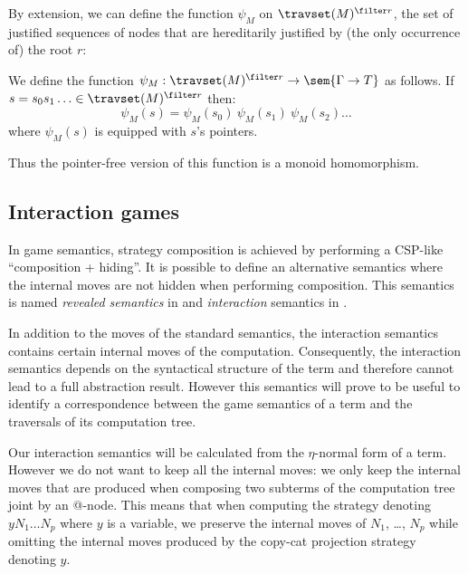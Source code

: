 By extension, we can define the function $\psi_M$ on $\travset(M)^{\filter r}$, the set of justified
sequences of nodes that are hereditarily justified by (the only occurrence of) the root $r$:
\begin{definition}
We define the function $\psi_M : \travset(M)^{\filter r} \rightarrow \sem{\Gamma \rightarrow T}$ as follows.
If $s = s_0 s_1 \ldots \in \travset(M)^{\filter r}$ then:
$$\psi_M(s) = \psi_M(s_0)\ \psi_M(s_1)\  \psi_M(s_2) \ldots$$
where $\psi_M(s)$ is equipped with $s$'s pointers.

Thus the pointer-free version of this function is a monoid homomorphism.
\end{definition}


\subsection{Interaction games}
\label{sec:interaction_semantics}

In game semantics, strategy composition is achieved by performing a
CSP-like ``composition + hiding''. It is possible to define an
alternative semantics where the internal moves are not hidden when
performing composition. This semantics is named \emph{revealed
semantics} in \cite{willgreenlandthesis} and \emph{interaction}
semantics in \cite{DBLP:conf/sas/DimovskiGL05}.

In addition to the moves of the standard semantics, the interaction
semantics contains certain internal moves of the computation.
Consequently, the interaction semantics depends on the syntactical
structure of the term and therefore cannot lead to a full
abstraction result. However this semantics will prove to be useful
to identify a correspondence between the game semantics of a term
and the traversals of its computation tree.

Our interaction semantics will be calculated from the $\eta$-normal
form of a term. However we do not want to keep all the internal
moves: we only keep the internal moves that are produced when
composing two subterms of the computation tree joint by an @-node.
This means that when computing the strategy denoting $y N_1 \ldots
N_p$ where $y$ is a variable, we preserve the internal moves of
$N_1$, \ldots, $N_p$ while omitting the internal moves produced by
the copy-cat projection strategy denoting $y$.


